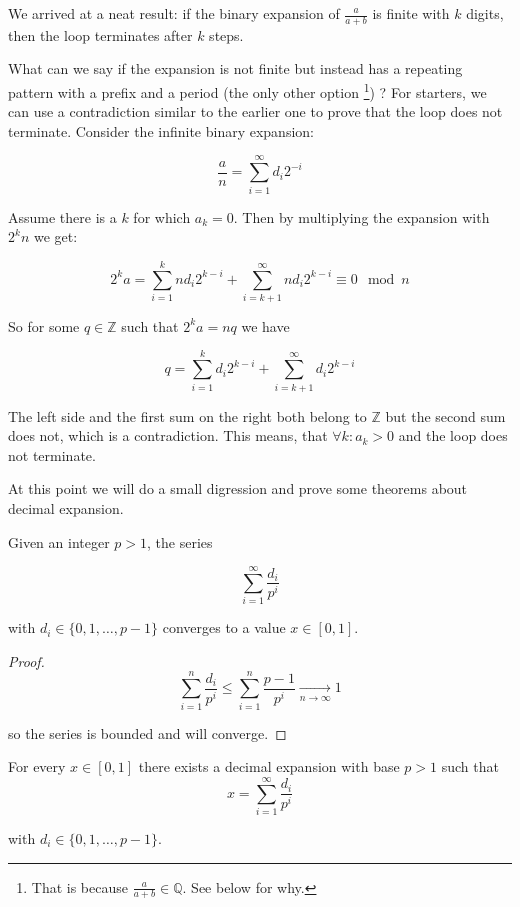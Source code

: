 We arrived at a neat result: if the binary expansion of $\frac{a}{a+b}$ is finite with $k$ digits, then the loop terminates after $k$ steps.

What can we say if the expansion is not finite but instead has a repeating pattern with a prefix and a period (the only other option \footnote{That is because $\frac{a}{a+b} \in \mathbb{Q}$. See below for why.}) ? For starters, we can use a contradiction similar to the earlier one to prove that the loop does not terminate. Consider the infinite binary expansion:

$$
  \frac{a}{n} = \sum_{i = 1}^\infty d_i 2^{-i}
$$

Assume there is a $k$ for which $a_k = 0$. Then by multiplying the expansion with $2^k n$ we get:

$$
  2^k a = \sum_{i = 1}^k n d_i 2^{k-i} + \sum_{i = k+1}^\infty n d_i 2^{k-i} \equiv 0 \mod n
$$

So for some $q \in \mathbb{Z}$ such that $2^k a = n q$ we have

$$
  q = \sum_{i = 1}^k d_i 2^{k-i} + \sum_{i = k+1}^\infty d_i 2^{k-i}
$$

The left side and the first sum on the right both belong to $\mathbb{Z}$ but the second sum does not, which is a contradiction. This means, that $\forall k: a_k > 0$ and the loop does not terminate.

At this point we will do a small digression and prove some theorems about decimal expansion. 

\begin{thm}\label{while_a_decimal_expansion_one}
Given an integer $p > 1$, the series

$$
\sum_{i=1}^\infty \frac{d_i}{p^i}
$$

with $d_i \in \{0, 1, \ldots, p-1\}$ converges to a value $x \in [0, 1]$.
\end{thm}

\begin{proof}

$$
\sum_{i=1}^n \frac{d_i}{p^i} \leq \sum_{i=1}^n \frac{p-1}{p^i} \xrightarrow[n \to \infty]{} 1
$$

so the series is bounded and will converge.
\end{proof}

\begin{thm}\label{while_a_decimal_expansion_two}
For every $x \in [0, 1]$ there exists a decimal expansion with base $p > 1$ such that
$$
x = \sum_{i=1}^\infty \frac{d_i}{p^i}
$$

with $d_i \in \{0, 1, \ldots, p-1\}$.
\end{thm}

